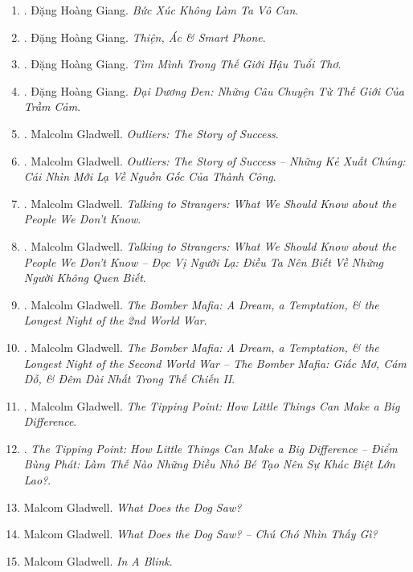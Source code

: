\documentclass{article}
\begin{document}
\begin{enumerate}
	\item \cite{Giang2022b}. Đặng Hoàng Giang. \textit{Bức Xúc Không Làm Ta Vô Can}.\hfill{\sf[finished]}
	\item \cite{Giang2022c}. Đặng Hoàng Giang. \textit{Thiện, Ác \& Smart Phone}.\hfill{\sf[finished]}
	\item \cite{Giang2022d}. Đặng Hoàng Giang. \textit{Tìm Mình Trong Thế Giới Hậu Tuổi Thơ}.\hfill{\sf[finished]}
	\item \cite{Giang2023}. Đặng Hoàng Giang. \textit{Đại Dương Đen: Những Câu Chuyện Từ Thế Giới Của Trầm Cảm}.\hfill{\sf[finished]}
	\item \cite{Gladwell2008}. Malcolm Gladwell. \textit{Outliers: The Story of Success}.\hfill{\sf[reading]}
	\item \cite{Gladwell_outlier}. Malcolm Gladwell. \textit{Outliers: The Story of Success -- Những Kẻ Xuất Chúng: Cái Nhìn Mới Lạ Về Nguồn Gốc Của Thành Công}.\hfill{\sf[finished]}
	\item \cite{Gladwell2019}. Malcolm Gladwell. \textit{Talking to Strangers: What We Should Know about the People We Don't Know}.\hfill{\sf[reading]}
	\item \cite{Gladwell_stranger}. Malcolm Gladwell. \textit{Talking to Strangers: What We Should Know about the People We Don't Know -- Đọc Vị Người Lạ: Điều Ta Nên Biết Về Những Người Không Quen Biết}.\hfill{\sf[finished]}
	\item \cite{Gladwell2021}. Malcolm Gladwell. \textit{The Bomber Mafia: A Dream, a Temptation, \& the Longest Night of the 2nd World War}.\hfill{\sf[reading]}
	\item \cite{Gladwell_bomber_mafia}. Malcolm Gladwell. \textit{The Bomber Mafia: A Dream, a Temptation, \& the Longest Night of the Second World War -- The Bomber Mafia: Giấc Mơ, Cám Dỗ, \& Đêm Dài Nhất Trong Thế Chiến II}.\hfill{\sf[finished]}
	\item \cite{Gladwell2022}. Malcolm Gladwell. \textit{The Tipping Point: How Little Things Can Make a Big Difference}.\hfill{\sf[reading]}
	\item \cite{Gladwell_tipping_point}. \textit{The Tipping Point: How Little Things Can Make a Big Difference -- Điểm Bùng Phát: Làm Thế Nào Những Điều Nhỏ Bé Tạo Nên Sự Khác Biệt Lớn Lao?}.\hfill{\sf[finished]}
	\item Malcom Gladwell. \textit{What Does the Dog Saw?}
	\item Malcom Gladwell. \textit{What Does the Dog Saw? -- Chú Chó Nhìn Thấy Gì?}
	\item Malcom Gladwell. \textit{In A Blink}.

\end{enumerate}
\end{document}
